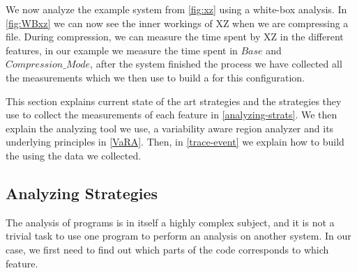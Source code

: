 We now analyze the example system from \autoref{fig:xz} using a white-box analysis. In \autoref{fig:WBxz} we can now see the inner workings of 
XZ when we are compressing a file. During compression, we can measure the time spent by XZ in the different features, in our example we measure 
the time spent in $Base$ and $Compression\_Mode$, after the system finished the process we have collected all the measurements which we 
then use to build a \perfInfluenceModel for this configuration.

This section explains current state of the art strategies and the strategies they use to collect the measurements of each feature in
\autoref{analyzing-strats}. We then explain the analyzing tool we use, a variability aware region analyzer and its underlying principles
in \autoref{VaRA}. Then, in \autoref{trace-event} we explain how to build the \perfInfluenceModel using the data we collected.





\subsection{Analyzing Strategies}\label{analyzing-strats}
The analysis of programs is in itself a highly complex subject, and it is not a trivial task to use one program to perform an analysis on another system.
In our case, we first need to find out which parts of the code corresponds to which feature.

